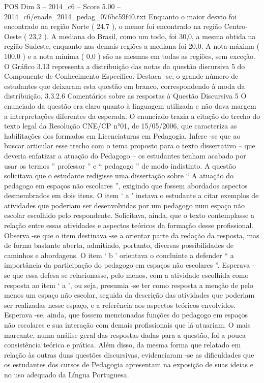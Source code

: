 \begin{textsample}{POS Dim 3 – 2014\_c6 – Score 5.00 – 2014\_c6/enade\_2014\_pedag\_076bc59f40.txt}
Enquanto o maior desvio foi encontrado na região Norte ( 24,7 ), o menor foi encontrado na região Centro-Oeste ( 23,2 ).
A mediana do Brasil, como um todo, foi 30,0, a mesma obtida na região Sudeste, enquanto nas demais regiões a mediana foi 20,0.
A nota máxima ( 100,0 ) e a nota mínima ( 0,0 ) são as mesmas em todas as regiões, sem exceção.
O Gráfico 3.13 representa a distribuição das notas da questão discursiva 5 do Componente de Conhecimento Específico.
Destaca -se, o grande número de estudantes que deixaram esta questão em branco, correspondendo à moda da distribuição. 3.3.2.6 Comentários sobre as respostas à Questão Discursiva 5 O enunciado da questão era claro quanto à linguagem utilizada e não dava margem a interpretações diferentes da esperada.
O enunciado trazia a citação do trecho do texto legal da Resolução CNE/CP n{\EmojiFont °}01, de 15/05/2006, que caracteriza as habilitações dos formados em Licenciaturas em Pedagogia.
Infere -se que ao buscar articular esse trecho com o tema proposto para o texto dissertativo – que deveria enfatizar a atuação do Pedagogo – os estudantes tenham acabado por usar os termos ” professor ” e “ pedagogo ” de modo indistinto.
A questão solicitava que o estudante redigisse uma dissertação sobre “ A atuação do pedagogo em espaços não escolares ”, exigindo que fossem abordados aspectos desmembrados em dois itens.
O item ‘ a ’ instava o estudante a citar exemplos de atividades que poderiam ser desenvolvidas por um pedagogo num espaço não escolar escolhido pelo respondente.
Solicitava, ainda, que o texto contemplasse a relação entre essas atividades e aspectos teóricos da formação desse profissional.
Observa -se que o item destinava -se a orientar parte da redação da resposta, mas de forma bastante aberta, admitindo, portanto, diversas possibilidades de caminhos e abordagens.
O item ‘ b ’ orientava o concluinte a defender “ a importância da participação do pedagogo em espaços não escolares ”.
Esperava -se que essa defesa se relacionasse, pelo menos, com a atividade escolhida como resposta ao item ‘ a ’, ou seja, presumia -se ter como resposta a menção de pelo menos um espaço não escolar, seguida da descrição das atividades que poderiam ser realizadas nesse espaço, e a referência aos aspectos teóricos envolvidos.
Esperava -se, ainda, que fossem mencionadas funções do pedagogo em espaços não escolares e sua interação com demais profissionais que lá atuariam.
O mais marcante, numa análise geral das respostas dadas para a questão, foi a pouca consistência teórica e prática.
Além disso, da mesma forma que relatado em relação às outras duas questões discursivas, evidenciaram -se as dificuldades que os estudantes dos cursos de Pedagogia apresentam na exposição de suas ideias e no uso adequado da Língua Portuguesa.

\end{textsample}
